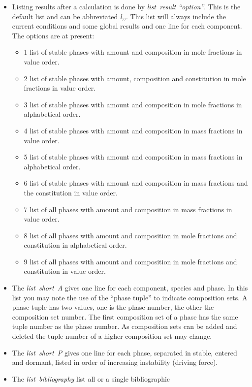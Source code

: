 \documentclass[12pt]{article}
\begin{document}
\begin{itemize}
\item Listing results after a calculation is done by {\em list~result
  ``option''}.  This is the default list and can be abbreviated {\em
  l,,}.  This list will always include the current conditions and some
  global results and one line for each component.  The options are at
  present:
  \begin{itemize}
    \item 1 list of stable phases with amount and composition in mole
      fractions in value order.
    \item 2 list of stable phases with amount, composition and
      constitution in mole fractions in value order.
    \item 3 list of stable phases with amount and composition in mole
      fractions in alphabetical order.
    \item 4 list of stable phases with amount and composition in
      mass fractions in value order.
    \item 5 list of stable phases with amount and composition in
      mass fractions in alphabetical order.
    \item 6 list of stable phases with amount and composition in
      mass fractions and the constitution in value order.
    \item 7 list of all phases with amount and composition in
      mass fractions in value order.
    \item 8 list of all phases with amount and composition in
      mole fractions and constitution in alphabetical order.
    \item 9 list of all phases with amount and composition in
      mole fractions and constitution in value order.
  \end{itemize}
\item The {\em list~short~A} gives one line for each component,
  species and phase.  In this list you may note the use of the ``phase
  tuple'' to indicate composition sets.  A phase tuple has two values,
  one is the phase number, the other the composition set number.  The
  first composition set of a phase has the same tuple number as the
  phase number.  As composition sets can be added and deleted the
  tuple number of a higher composition set may change.
\item The {\em list~short~P} gives one line for each phase, separated
  in stable, entered and dormant, listed in order of increasing
  instability (driving force).
\item The {\em list~bibliography} list all or a single bibliographic

\end{itemize}
\end{document}
